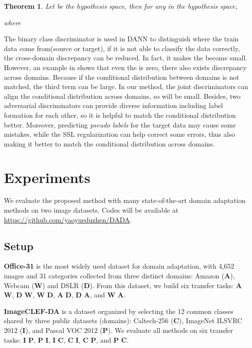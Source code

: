 \documentclass{ecai}
\begin{document}
\newtheorem{thm}{\bf Theorem}
\begin{thm}
Let  be the hypothesis space, then for any  in the hypothesis space,

where

\end{thm}
 The binary class discriminator  is used in DANN to distinguish where the train data come from(source or target), if it is not able to classify the data correctly, the cross-domain discrepancy can be reduced. In fact, it makes the  become small. However, an example in \cite{b31} shows that even the  is zero, there also exists discrepancy across domains. Because if the conditional distribution between domains is not matched, the third term  can be large. In our method, the joint discriminators can align the conditional distribution across domains, so  will be small. Besides, two adversarial discriminators can provide diverse information including label formation for each other, so it is helpful to match the conditional distribution better. Moreover, predicting {\emph{pseudo labels}} for the target data may cause some mistakes, while the SSL  regularization can help correct some errors, thus also making it better to match the conditional distribution across domains.






\section{Experiments}



We evaluate the proposed method with many state-of-the-art domain adaptation methods on two image datasets. Codes will be available at  \url{https://github.com/yaoyueduzhen/DADA}.

\subsection{Setup}
\textbf{Office-31}\cite{b32} is the most widely used dataset for domain adaptation, with 4,652 images and 31 categories collected from three distinct domains: Amazon (\textbf{A}), Webcam (\textbf{W}) and DSLR (\textbf{D}). From this dataset, we build six transfer tasks: \textbf{A}  \textbf{W}, \textbf{D}  \textbf{W}, \textbf{W}  \textbf{D}, \textbf{A}  \textbf{D}, \textbf{D}  \textbf{A}, and \textbf{W}  \textbf{A}.

\textbf{ImageCLEF-DA}\cite{b10} is a dataset organized by selecting the 12 common classes shared by three public datasets (domains): Caltech-256 (\textbf{C}), ImageNet ILSVRC 2012 (\textbf{I}), and Pascal VOC 2012 (\textbf{P}). We evaluate all methods on six transfer tasks: \textbf{I}  \textbf{P}, \textbf{P}  \textbf{I}, \textbf{I}  \textbf{C}, \textbf{C}  \textbf{I}, \textbf{C}  \textbf{P}, and \textbf{P}  \textbf{C}.
\end{document}
